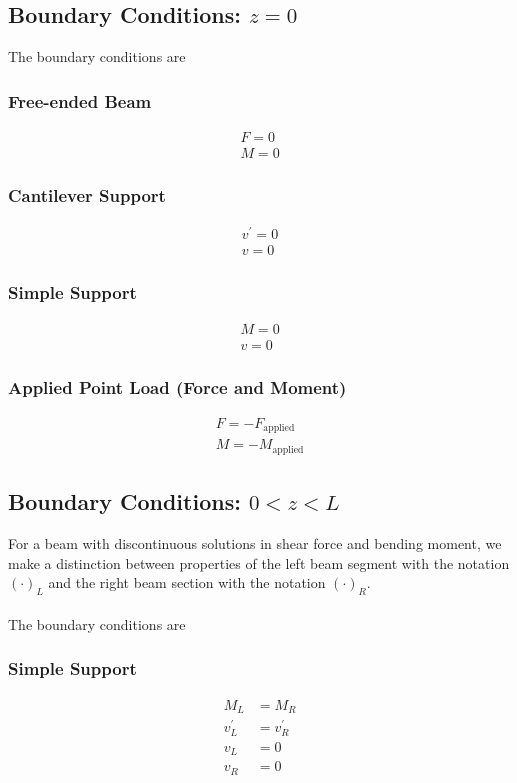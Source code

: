 \documentclass[11pt,a4paper]{article}
\begin{document}
\subsection{Boundary Conditions: $z = 0$}
The boundary conditions are
\subsubsection*{Free-ended Beam}
\begin{align}
	F = 0 \\
	M = 0
\end{align}
\subsubsection*{Cantilever Support}
\begin{align}
	v^{'} = 0 \\
	v = 0
\end{align}
\subsubsection*{Simple Support}
\begin{align}
	M = 0 \\
	v = 0
\end{align}
\subsubsection*{Applied Point Load (Force and Moment)}
\begin{align}
	F = -F_{\text{applied}} \\
	M = -M_{\text{applied}}
\end{align}
\subsection{Boundary Conditions: $0 < z < L$}
For a beam with discontinuous solutions in shear force and bending moment, we make a distinction between properties of the left beam segment with the notation $(\cdot)_{L}$ and the right beam section with the notation $(\cdot)_{R}$.\\
\\
The boundary conditions are
\subsubsection*{Simple Support}
\begin{align}
	M_{L} &= M_{R} \\
	v_{L}^{'} &= v_{R}^{'} \\
	v_{L} &= 0 \\
	v_{R} &= 0
\end{align}
\end{document}
